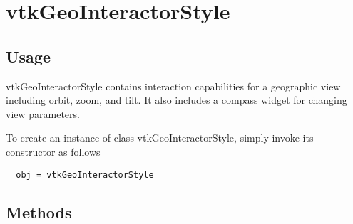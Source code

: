 \section{vtkGeoInteractorStyle}

\subsection{Usage}

 vtkGeoInteractorStyle contains interaction capabilities for a geographic
 view including orbit, zoom, and tilt. It also includes a compass widget
 for changing view parameters.


To create an instance of class vtkGeoInteractorStyle, simply
invoke its constructor as follows
\begin{verbatim}
  obj = vtkGeoInteractorStyle
\end{verbatim}
\subsection{Methods}

